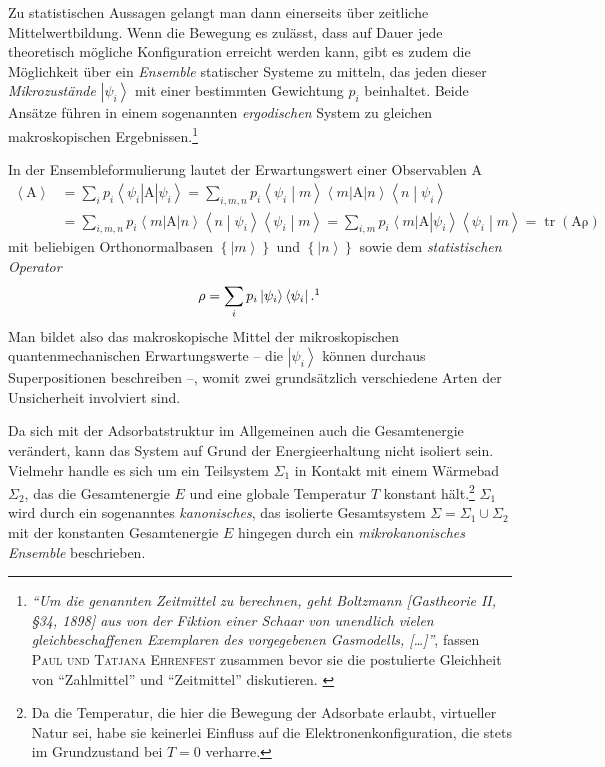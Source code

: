 \documentclass[a4paper, 10pt, twoside, openany]{book} %
\newcommand \bra[1]{\left \langle #1 \right |}
\newcommand \ket[1]{\left | #1 \right \rangle}
\newcommand \bracket[2]{\left \langle #1 \middle | #2 \right \rangle}
\newcommand \braces[1]{\left \lbrace #1 \right \rbrace}
\newcommand \av[1]{\left \langle #1 \right \rangle}
\newcommand \op[1]{\mathrm{#1}}
\begin{document}
	Zu statistischen Aussagen gelangt man dann einerseits über zeitliche Mittelwertbildung. Wenn die Bewegung es zulässt, dass auf Dauer jede theoretisch mögliche Konfiguration erreicht werden kann, gibt es zudem die Möglichkeit über ein \emph{Ensemble} statischer Systeme zu mitteln, das jeden dieser \emph{Mikrozustände} $\ket{\psi_i}$ mit einer bestimmten Gewichtung $p_i$ beinhaltet. Beide Ansätze führen in einem sogenannten \emph{ergodischen} System zu gleichen makroskopischen Ergebnissen.\footnote{\emph{"`Um die genannten Zeitmittel zu berechnen, geht \emph{Boltzmann} \emph{[Gastheorie II, \S 34, 1898]} aus von der Fiktion einer Schaar von unendlich vielen gleichbeschaffenen Exemplaren des vorgegebenen Gasmodells, \emph{[\dots]}"'}, fassen \textsc{Paul und Tatjana Ehrenfest} zusammen bevor sie die postulierte Gleichheit von "`Zahlmittel"' und "`Zeitmittel"' diskutieren. \cite[S.~34]{Ehrenfest1}}
	
	In der Ensembleformulierung lautet der Erwartungswert einer Observablen $\op A$
	\begin{align*}
		\av{\op A} &= \sum_i p_i \bra{\psi_i} \op A \ket{\psi_i} = \sum_{i, m, n} p_i \bracket {\psi_i} m \bra m \op A \ket n \bracket n {\psi_i} \\
		&= \sum_{i, m, n} p_i \bra m \op A \ket n \bracket n {\psi_i} \bracket {\psi_i} m = \sum_{i, m} p_i \bra m \op A \ket{\psi_i} \bracket {\psi_i} m = \operatorname{tr}(\op A \op \rho)
	\end{align*}
	mit beliebigen Orthonormalbasen $\braces{\ket m}$ und $\braces{\ket n}$ sowie dem \emph{statistischen Operator}
	\begin{align}
		\op \rho = \sum_i p_i \ket{\psi_i} \bra{\psi_i}.\footnotemark
		\label{statistischer Operator}
	\end{align}
	Man bildet also das makroskopische Mittel der mikroskopischen quantenmechanischen Erwartungswerte -- die $\ket{\psi_i}$ können durchaus Superpositionen beschreiben --, womit zwei grundsätzlich verschiedene Arten der Unsicherheit involviert sind.
	
	Da sich mit der Adsorbatstruktur im Allgemeinen auch die Gesamtenergie verändert, kann das System auf Grund der Energieerhaltung nicht isoliert sein. Vielmehr handle es sich um ein Teilsystem $\Sigma_1$ in Kontakt mit einem Wärmebad $\Sigma_2$, das die Gesamtenergie $E$ und eine globale Temperatur $T$ konstant hält.\footnote{Da die Temperatur, die hier die Bewegung der Adsorbate erlaubt, virtueller Natur sei, habe sie keinerlei Einfluss auf die Elektronenkonfiguration, die stets im Grundzustand bei $T = 0$ verharre.} $\Sigma_1$ wird durch ein sogenanntes \emph{kanonisches}, das isolierte Gesamtsystem $\Sigma = \Sigma_1 \cup \Sigma_2$ mit der konstanten Gesamtenergie $E$ hingegen durch ein \emph{mikrokanonisches Ensemble} beschrieben.
	
\end{document}
